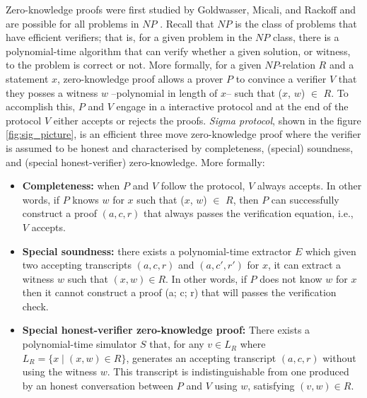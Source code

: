 \documentclass[conference,compsoc]{IEEEtran}
\begin{document}
Zero-knowledge proofs were first studied by Goldwasser, Micali, and Rackoff \cite{10.1145/22145.22178} and 
are possible for all problems in $NP$ \cite{10.1145/116825.116852}. Recall that $NP$ is the class of 
problems that have efficient verifiers; that is, for a given problem in the $NP$ class, there is 
a polynomial-time algorithm that can verify whether a given solution, or witness, to the problem is correct or not.
More formally, for a given $NP$-relation $R$ and a statement $x$, zero-knowledge proof allows a prover 
$P$ to convince a verifier $V$ that they posses a witness $w$ --polynomial in length of $x$-- such 
that ($x$, $w$) $\in$ $R$. To accomplish this, $P$ and $V$ engage in a 
interactive protocol and  at the end of the protocol $V$ either accepts or rejects the proofs.
\textit{Sigma protocol}, shown in the figure \ref{fig:sig_picture}, is an efficient three move zero-knowledge proof where the 
verifier is assumed to be honest and characterised by completeness, (special) soundness, and 
(special honest-verifier) zero-knowledge. More formally: 
\begin{itemize}
  \item \textbf{Completeness:}
  when $P$ and $V$ follow the protocol, $V$ always accepts. 
  In other words, if $P$ knows $w$ for $x$ such that ($x$, $w$) $\in$ $R$,  
  then $P$ can successfully construct a proof $(a, c, r)$ that always passes the verification equation, 
  i.e., $V$ accepts. 

\item \textbf{Special soundness:}
there exists a polynomial-time extractor $E$ which given 
two accepting transcripts $(a, c, r)$ and $(a, c', r')$ for $x$, 
it can extract a witness $w$ such that $(x, w) \in R$. In other words, 
if $P$ does not know $w$ for $x$ then it cannot construct a proof 
(a; c; r) that will passes the verification check. 
\item \textbf{Special honest-verifier zero-knowledge proof:}
There exists a polynomial-time simulator $S$ that, for any 
$v \in L_R$ where $L_R = \{x  \mid (x, w) \in R\}$,
generates an accepting transcript $(a, c, r)$ 
without using the witness $w$. 
This transcript is indistinguishable from one produced by an 
honest conversation between $P$ and $V$ using $w$, 
satisfying $(v,w) \in R$.

\end{itemize}
\end{document}
